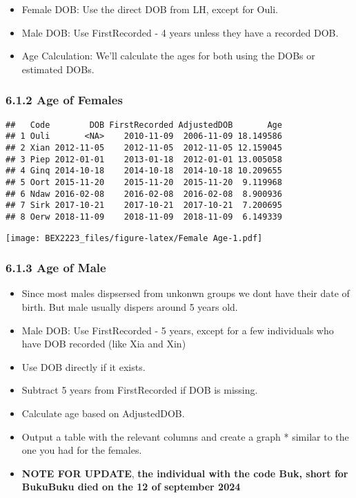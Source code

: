 \documentclass[
]{article}
\providecommand{\tightlist}{%
  \setlength{\itemsep}{0pt}\setlength{\parskip}{0pt}}
\begin{document}
\begin{itemize}
\tightlist
\item
  Female DOB: Use the direct DOB from LH, except for Ouli.
\item
  Male DOB: Use FirstRecorded - 4 years unless they have a recorded DOB.
\item
  Age Calculation: We'll calculate the ages for both using the DOBs or
  estimated DOBs.
\end{itemize}

\hypertarget{age-of-females}{%
\subsubsection{6.1.2 Age of Females}\label{age-of-females}}

\begin{verbatim}
##   Code        DOB FirstRecorded AdjustedDOB       Age
## 1 Ouli       <NA>    2010-11-09  2006-11-09 18.149586
## 2 Xian 2012-11-05    2012-11-05  2012-11-05 12.159045
## 3 Piep 2012-01-01    2013-01-18  2012-01-01 13.005058
## 4 Ginq 2014-10-18    2014-10-18  2014-10-18 10.209655
## 5 Oort 2015-11-20    2015-11-20  2015-11-20  9.119968
## 6 Ndaw 2016-02-08    2016-02-08  2016-02-08  8.900936
## 7 Sirk 2017-10-21    2017-10-21  2017-10-21  7.200695
## 8 Oerw 2018-11-09    2018-11-09  2018-11-09  6.149339
\end{verbatim}

\texttt{[image: BEX2223\_files/figure-latex/Female Age-1.pdf]}

\hypertarget{age-of-male}{%
\subsubsection{6.1.3 Age of Male}\label{age-of-male}}

\begin{itemize}
\item
  Since most males dispsersed from unkonwn groups we dont have their
  date of birth. But male usually dispers around 5 years old.
\item
  Male DOB: Use FirstRecorded - 5 years, except for a few individuals
  who have DOB recorded (like Xia and Xin)
\item
  Use DOB directly if it exists.
\item
  Subtract 5 years from FirstRecorded if DOB is missing.
\item
  Calculate age based on AdjustedDOB.
\item
  Output a table with the relevant columns and create a graph * similar
  to the one you had for the females.
\item
  \textbf{NOTE FOR UPDATE}, \textbf{the individual with the code Buk,
  short for BukuBuku died on the 12 of september 2024}
\end{itemize}
\end{document}
